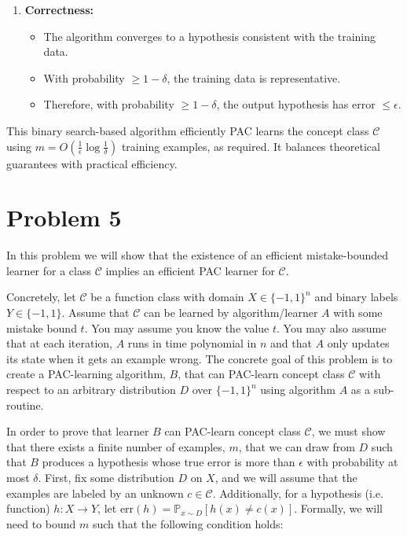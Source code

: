 \documentclass{article}
\begin{document}
\begin{enumerate}
    \item \textbf{Correctness:}
    \begin{itemize}
        \item The algorithm converges to a hypothesis consistent with the training data.
        \item With probability $\geq 1 - \delta$, the training data is representative.
        \item Therefore, with probability $\geq 1 - \delta$, the output hypothesis has error $\leq \epsilon$.
    \end{itemize}
\end{enumerate}

This binary search-based algorithm efficiently PAC learns the concept class $\mathcal{C}$ using $m = O(\frac{1}{\epsilon} \log \frac{1}{\delta})$ training examples, as required. It balances theoretical guarantees with practical efficiency.

\section*{Problem 5}

\noindent [6 points] In this problem we will show that the existence of an efficient mistake-bounded learner for a class $\mathcal{C}$ implies an efficient PAC learner for $\mathcal{C}$.

Concretely, let $\mathcal{C}$ be a function class with domain $X \in \{-1,1\}^n$ and binary labels $Y \in \{-1,1\}$. Assume that $\mathcal{C}$ can be learned by algorithm/learner $A$ with some mistake bound $t$. You may assume you know the value $t$. You may also assume that at each iteration, $A$ runs in time polynomial in $n$ and that $A$ only updates its state when it gets an example wrong. The concrete goal of this problem is to create a PAC-learning algorithm, $B$, that can PAC-learn concept class $\mathcal{C}$ with respect to an arbitrary distribution $D$ over $\{-1,1\}^n$ using algorithm $A$ as a sub-routine.

In order to prove that learner $B$ can PAC-learn concept class $\mathcal{C}$, we must show that there exists a finite number of examples, $m$, that we can draw from $D$ such that $B$ produces a hypothesis whose true error is more than $\epsilon$ with probability at most $\delta$. First, fix some distribution $D$ on $X$, and we will assume that the examples are labeled by an unknown $c \in \mathcal{C}$. Additionally, for a hypothesis (i.e. function) $h : X \to Y$, let $\text{err}(h) = \mathbb{P}_{x\sim D}[h(x) \neq c(x)]$. Formally, we will need to bound $m$ such that the following condition holds:
\end{document}
